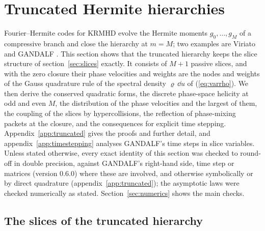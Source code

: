 \section{Truncated Hermite hierarchies}\label{sec:truncated}

Fourier--Hermite codes for KRMHD evolve the Hermite moments $g_0,\dots,g_M$ of a compressive branch and close the hierarchy at $m=M$; two examples are Viriato \citep{Loureiro2016} and GANDALF \citep{Kanekar2025}. This section shows that the truncated hierarchy keeps the slice structure of section~\ref{sec:slices} exactly. It consists of $M+1$ passive slices, and with the zero closure their phase velocities and weights are the nodes and weights of the Gauss quadrature rule of the spectral density $\varrho\,\dd u$ of (\ref{eq:varrho}). We then derive the conserved quadratic forms, the discrete phase-space helicity at odd and even $M$, the distribution of the phase velocities and the largest of them, the coupling of the slices by hypercollisions, the reflection of phase-mixing packets at the closure, and the consequences for explicit time stepping. Appendix~\ref{app:truncated} gives the proofs and further detail, and appendix~\ref{app:timestepping} analyses GANDALF's time steps in slice variables. Unless stated otherwise, every exact identity of this section was checked to round-off in double precision, against GANDALF's right-hand side, time step or matrices (version 0.6.0) where these are involved, and otherwise symbolically or by direct quadrature (appendix~\ref{app:truncated}); the asymptotic laws were checked numerically as stated. Section~\ref{sec:numerics} shows the main checks.

\subsection{The slices of the truncated hierarchy}\label{tr:slicesec}

